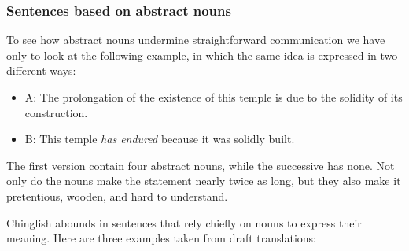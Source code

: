 \documentclass{article}
\begin{document}
\subsubsection{Sentences based on abstract nouns}
To see how abstract nouns undermine straightforward communication we have only to look at the following example, in which the same idea is expressed in two different ways:

\begin{itemize}
  \item A: The prolongation of the existence of this temple is due to the solidity of its construction.
  \item B: This temple \emph{has endured} because it was solidly built.
\end{itemize}

The first version contain four abstract nouns, while the successive has none. Not only do the nouns make the statement nearly twice as long, but they also make it pretentious, wooden, and hard to understand.

Chinglish abounds in sentences that rely chiefly on nouns to express their meaning. Here are three examples taken from draft translations:

 
\end{document}
